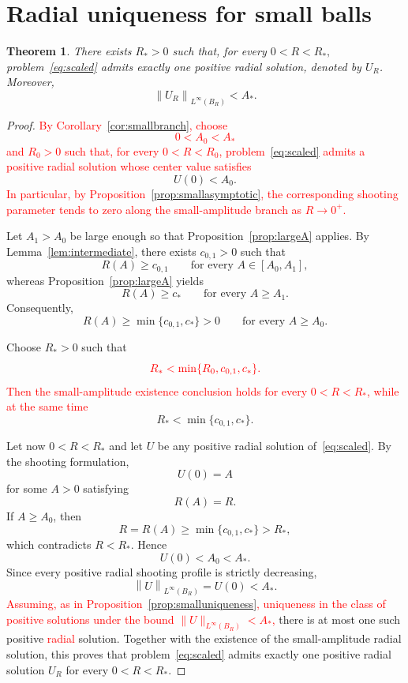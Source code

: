 \documentclass[11pt]{article}
\newcommand{\norm}[1]{\left\|#1\right\|}
\newtheorem{theorem}{Theorem}[section]
\theoremstyle{definition}
\begin{document}
  
\section{Radial uniqueness for small balls}

\begin{theorem}
\label{thm:radial}
There exists $R_*>0$ such that, for every
\(
0<R<R_*,
\)
problem~\eqref{eq:scaled} admits exactly one positive radial solution,
denoted by $U_R$. Moreover,
\[
\norm{U_R}_{L^\infty(B_R)}<A_*.
\]
\end{theorem}

\begin{proof}
\textcolor{red}{By Corollary~\ref{cor:smallbranch}, choose
\[
0<A_0<A_*
\]
and $R_0>0$ such that, for every $0<R<R_0$,
problem~\eqref{eq:scaled} admits a positive radial solution whose
center value satisfies}
\[
U(0)<A_0.
\]
\textcolor{red}{In particular, by
Proposition~\ref{prop:smallasymptotic}, the corresponding shooting
parameter tends to zero along the small-amplitude branch as
$R\to0^+$.}

Let $A_1>A_0$ be large enough so that
Proposition~\ref{prop:largeA} applies. By
Lemma~\ref{lem:intermediate}, there exists $c_{0,1}>0$ such that
\[
R(A)\geq c_{0,1}
\qquad
\text{for every }A\in[A_0,A_1],
\]
whereas Proposition~\ref{prop:largeA} yields
\[
R(A)\geq c_*
\qquad
\text{for every }A\geq A_1.
\]
Consequently,
\[
R(A)\geq
\min\{c_{0,1},c_*\}>0
\qquad
\text{for every }A\geq A_0.
\]

Choose $R_*>0$ such that
\[
\textcolor{red}{
R_*<
\min\{R_0,c_{0,1},c_*\}.
}
\]
\textcolor{red}{Then the small-amplitude existence conclusion holds
for every $0<R<R_*$, while at the same time}
\[
R_*<\min\{c_{0,1},c_*\}.
\]

Let now $0<R<R_*$ and let $U$ be any positive radial solution
of~\eqref{eq:scaled}. By the shooting formulation,
\[
U(0)=A
\]
for some $A>0$ satisfying
\[
R(A)=R.
\]
If $A\geq A_0$, then
\[
R=R(A)
\geq
\min\{c_{0,1},c_*\}
>
R_*,
\]
which contradicts $R<R_*$. Hence
\[
U(0)<A_0<A_*.
\]
Since every positive radial shooting profile is strictly decreasing,
\[
\norm{U}_{L^\infty(B_R)}
=
U(0)
<
A_*.
\]
\textcolor{red}{Assuming, as in
Proposition~\ref{prop:smalluniqueness}, uniqueness in the class of
positive solutions under the bound
$\|U\|_{L^\infty(B_R)}<A_*$,}
there is at most one such positive \textcolor{red}{radial} solution.
Together with the existence of the small-amplitude radial solution,
this proves that problem~\eqref{eq:scaled} admits exactly one positive
radial solution $U_R$ for every $0<R<R_*$.
\end{proof}
    
\end{document}

